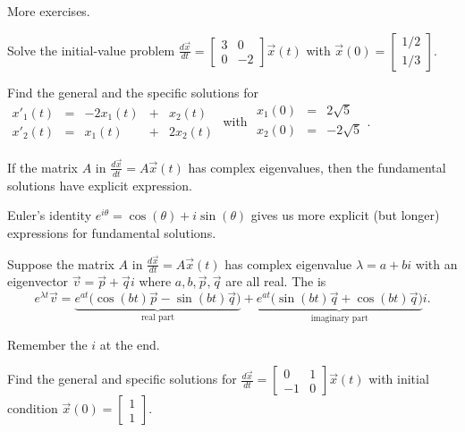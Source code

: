 \documentclass[../main.tex]{subfiles}
\begin{document}

\clearpage
More exercises.

\begin{example}
  Solve the initial-value problem \( \frac{d\vec{x}}{dt} = \begin{bmatrix} 3 & 0  \\ 0 & -2 \end{bmatrix} \vec{x}(t) \) with \(\vec{x}(0) = \begin{bmatrix} 1/2 \\ 1/3 \end{bmatrix}\).
\end{example}
\clearpage

\begin{example}
  Find the general and the specific solutions for
  \(
  \begin{array}{rcrcr}
    x'_{1}(t) &=& -2 x_{1}(t) &+&  x_{2}(t) \\
    x'_{2}(t) &=&    x_{1}(t) &+& 2x_{2}(t)
  \end{array}
  \) with \(
  \begin{array}{rcr}
    x_{1}(0) &=&  2 \sqrt{5} \\
    x_{2}(0) &=& -2 \sqrt{5} \\
  \end{array}
  \).

\end{example}
\clearpage

If the matrix \(A\) in \(\frac{d\vec{x}}{dt} = A \vec{x}(t)\) has complex eigenvalues, then the fundamental solutions have explicit expression. 

\begin{definition}
  Euler's identity \(e^{i \theta} = \cos(\theta) + i \sin(\theta)\) gives us more explicit (but longer) expressions for fundamental solutions. 

  Suppose the matrix \(A\) in \(\frac{d\vec{x}}{dt} = A \vec{x}(t)\) has complex eigenvalue \(\lambda = a + bi\) with an eigenvector \(\vec{v} = \vec{p} + \vec{q}i\) where \(a,b,\vec{p},\vec{q}\) are all real. The  is
  \[
    e^{\lambda t} \vec{v} = \underbrace{e^{at} \bigg( \cos(bt) \vec{p} - \sin(bt) \vec{q} \bigg)}_{\text{real part}} +  \underbrace{e^{at} \bigg( \sin(bt) \vec{q} + \cos(bt) \vec{q}\bigg)}_{\text{imaginary part}} i.
  \]

  Remember the \(i\) at the end.
\end{definition}

\begin{example}
  Find the general and specific solutions for \(\frac{d\vec{x}}{dt} = \begin{bmatrix} 0 & 1 \\ -1 & 0 \end{bmatrix}\vec{x}(t)\) with initial condition \(\vec{x}(0) = \begin{bmatrix} 1 \\ 1 \end{bmatrix}\).
\end{example}
\end{document}
